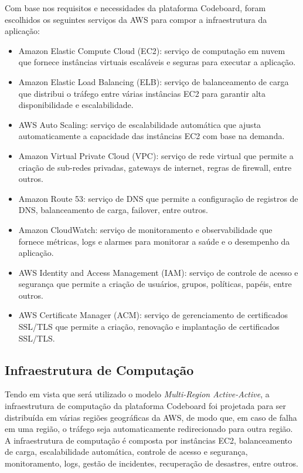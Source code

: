 Com base nos requisitos e necessidades da plataforma Codeboard, foram escolhidos os seguintes serviços da AWS para compor a infraestrutura da aplicação:

\begin{itemize}
    \item Amazon Elastic Compute Cloud (EC2): serviço de computação em nuvem que fornece instâncias virtuais escaláveis e seguras para executar a aplicação.
    \item Amazon Elastic Load Balancing (ELB): serviço de balanceamento de carga que distribui o tráfego entre várias instâncias EC2 para garantir alta disponibilidade e escalabilidade.
    \item AWS Auto Scaling: serviço de escalabilidade automática que ajusta automaticamente a capacidade das instâncias EC2 com base na demanda.
    \item Amazon Virtual Private Cloud (VPC): serviço de rede virtual que permite a criação de sub-redes privadas, gateways de internet, regras de firewall, entre outros.
    \item Amazon Route 53: serviço de DNS que permite a configuração de registros de DNS, balanceamento de carga, failover, entre outros.
    \item Amazon CloudWatch: serviço de monitoramento e observabilidade que fornece métricas, logs e alarmes para monitorar a saúde e o desempenho da aplicação.
    \item AWS Identity and Access Management (IAM): serviço de controle de acesso e segurança que permite a criação de usuários, grupos, políticas, papéis, entre outros.
    \item AWS Certificate Manager (ACM): serviço de gerenciamento de certificados SSL/TLS que permite a criação, renovação e implantação de certificados SSL/TLS.
\end{itemize}

\subsection{Infraestrutura de Computação}

Tendo em vista que será utilizado o modelo \emph{Multi-Region Active-Active}, a infraestrutura de computação da plataforma Codeboard foi projetada para ser distribuída em várias regiões geográficas da AWS, de modo que, em caso de falha em uma região, o tráfego seja automaticamente redirecionado para outra região. A infraestrutura de computação é composta por instâncias EC2, balanceamento de carga, escalabilidade automática, controle de acesso e segurança, monitoramento, logs, gestão de incidentes, recuperação de desastres, entre outros.

